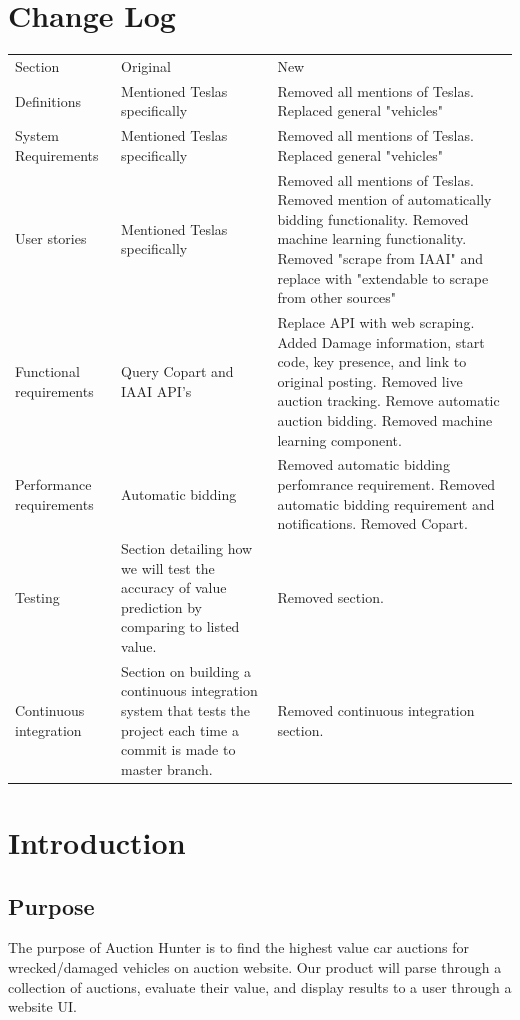 \documentclass[onecolumn, draftclsnofoot,10pt, compsoc]{IEEEtran}
\begin{document}
\section{Change Log}
\begin{table}[!h]
\begin{tabular}{p{4cm}|p{5cm}|p{7cm}}
Section & Original & New \\
\cline{1-3}
Definitions       & Mentioned Teslas specifically        & Removed all mentions of Teslas. Replaced general "vehicles"   \\
System Requirements       & Mentioned Teslas specifically        & Removed all mentions of Teslas. Replaced general "vehicles"    \\
User stories       & Mentioned Teslas specifically        & Removed all mentions of Teslas. Removed mention of automatically bidding functionality. Removed machine learning functionality. Removed "scrape from IAAI" and replace with "extendable to scrape from other sources" \\
     Functional requirements   &    Query Copart and IAAI API's      &   Replace API with web scraping. Added Damage information, start code, key presence, and link to original posting. Removed live auction tracking. Remove automatic auction bidding. Removed machine learning component.  \\
   Performance requirements     &       Automatic bidding   &  Removed automatic bidding perfomrance requirement. Removed automatic bidding requirement and notifications. Removed Copart.   \\
     Testing   &     Section detailing how we will test the accuracy of value prediction by comparing to listed value.  & Removed section. \\
     Continuous integration & Section on building a continuous integration system that tests the project each time a commit is made to master branch. & Removed continuous integration section. 
\end{tabular}
\end{table}




\section{Introduction}
\subsection{Purpose}
The purpose of Auction Hunter is to find the highest value car auctions for wrecked/damaged vehicles on auction website.
Our product will parse through a collection of auctions, evaluate their value, and display results to a user through a website UI. 
\end{document}
